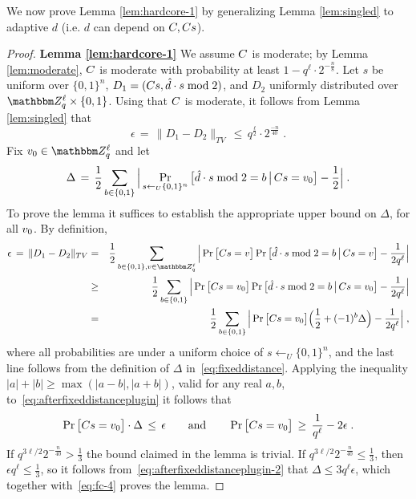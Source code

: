 We now prove Lemma \ref{lem:hardcore-1} by generalizing Lemma \ref{lem:singled} to adaptive $d$ (i.e. $d$ can  depend on $\*C, \*C\*s$).

\begin{proof}{\textbf{Lemma \ref{lem:hardcore-1}}}
We assume $\*C$ is moderate; by Lemma \ref{lem:moderate}, $\*C$ is moderate with probability at least $1-q^\ell\cdot 2^{-\frac{n}{8}}$. Let $s$ be uniform over $\{0,1\}^n$, $D_1 = (\*C\*s,\hat{d}\cdot s \bmod 2)$, and $D_2$ uniformly distributed over $\mZ_q^{\ell}\times \{0,1\}$. Using that $\*C$ is moderate, it follows from Lemma \ref{lem:singled} that 
\begin{equation}\label{eq:fc-4}
\epsilon\,=\,\|D_1-D_2\|_{TV} \,\leq\, q^{\frac{\ell}{2}}\cdot 2^{\frac{-n}{40}}\;.
\end{equation}
 Fix $\*v_0 \in \mZ_q^\ell$ and let 
\begin{eqnarray}\label{eq:fixeddistance}
\Delta \,=\, \frac{1}{2}\sum_{b\in \{0,1\}}\Big|\Pr_{s \leftarrow_U \{0,1\}^n}\big[\hat{d}\cdot s \bmod 2 = b \,\big| \, \*C\*s = \*v_0\big] - \frac{1}{2}\Big|\;.
\end{eqnarray}
To prove the lemma it suffices to establish the appropriate upper bound on $\Delta$, for all $\*v_0$. By definition, 
\begin{eqnarray}
\epsilon\,=\,\|D_1-D_2\|_{TV} &=& \frac{1}{2}\sum_{b\in \{0,1\}, v\in \mZ_q^{\ell}}\Big|\Pr\big[\*C\*s = \*v\big] \Pr\big[\hat{d}\cdot s \bmod 2 = b \,\big|\, \*C\*s = \*v\big] - \frac{1}{2q^\ell} \Big|\notag\\
&\geq& \frac{1}{2}\sum_{b\in \{0,1\}}\Big|\Pr\big[\*C\*s = \*v_0\big] \Pr\big[\hat{d}\cdot s \bmod 2 = b \,\big|\, \*C\*s = \*v_0\big] - \frac{1}{2q^\ell} \Big|\notag\\
&=& \frac{1}{2}\sum_{b\in \{0,1\}}\Big|\Pr\big[\*C\*s = \*v_0\big] \Big(\frac{1}{2} + (-1)^b\Delta\Big) - \frac{1}{2q^\ell} \Big|\;,\label{eq:afterfixeddistanceplugin}
\end{eqnarray}
where all probabilities are under a uniform choice of $s\leftarrow_U \{0,1\}^n$, and the last line follows from the definition of $\Delta$ in~\eqref{eq:fixeddistance}. Applying the inequality $|a|+|b| \geq \max(|a-b|,|a+b|)$, valid for any real $a,b$, to~\eqref{eq:afterfixeddistanceplugin} it follows that 
\begin{equation}
\Pr\big[\*C\*s = \*v_0\big]\cdot \Delta \,\leq\, \epsilon\qquad \text{and} \qquad 
\Pr\big[\*C\*s = \*v_0\big] \,\geq \,\frac{1}{q^\ell} - 2\epsilon\;.\label{eq:afterfixeddistanceplugin-2}
\end{equation}
If $q^{3\ell/2} 2^{-\frac{n}{40}} > \frac{1}{3}$ the bound claimed in the lemma is trivial. If $q^{3\ell/2} 2^{-\frac{n}{40}} \leq \frac{1}{3}$, then $\epsilon q^\ell \leq \frac{1}{3}$, so it follows from~\eqref{eq:afterfixeddistanceplugin-2} that $\Delta \leq 3q^\ell\epsilon$, which together with~\eqref{eq:fc-4} proves the lemma. 
\end{proof}


